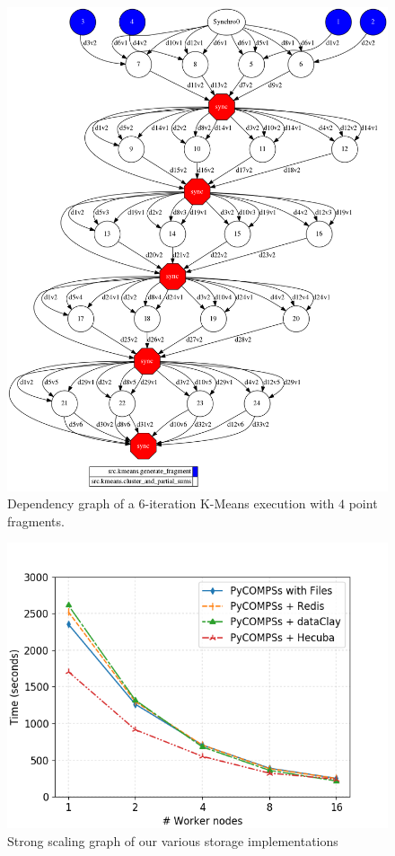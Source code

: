 \begin{figure}[ht!]
\centering
\includegraphics[scale = 0.3]{figures/kmeans_storage_dep_graph.png}
\caption{Dependency graph of a 6-iteration K-Means execution with $4$ point fragments.}
\label{fig:kmeans_storage_dep_graph}
\end{figure}

\begin{figure}[ht!]
\centering
\includegraphics[scale = 0.5]{figures/storage/kmeans_strong.png}
\caption{Strong scaling graph of our various storage implementations}
\label{fig:kmeans_strong_redis}
\end{figure}


